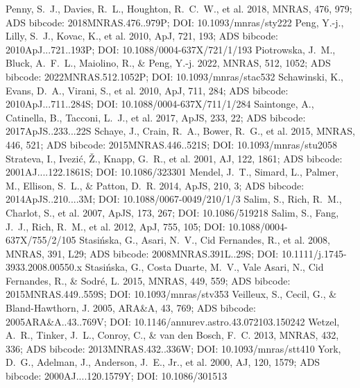 \documentclass[twocolumn]{aastex631}
\begin{document}
\begin{thebibliography}{}
 Penny, S.~J., Davies, R.~L., Houghton, R.~C.~W., et al. 2018, MNRAS, 476, 979; ADS bibcode: 2018MNRAS.476..979P; DOI: 10.1093/mnras/sty222
 Peng, Y.-j., Lilly, S.~J., Kovac, K., et al. 2010, ApJ, 721, 193; ADS bibcode: 2010ApJ...721..193P; DOI: 10.1088/0004-637X/721/1/193
 Piotrowska, J.~M., Bluck, A.~F.~L., Maiolino, R., \& Peng, Y.-j. 2022, MNRAS, 512, 1052; ADS bibcode: 2022MNRAS.512.1052P; DOI: 10.1093/mnras/stac532
 Schawinski, K., Evans, D.~A., Virani, S., et al. 2010, ApJ, 711, 284; ADS bibcode: 2010ApJ...711..284S; DOI: 10.1088/0004-637X/711/1/284
 Saintonge, A., Catinella, B., Tacconi, L.~J., et al. 2017, ApJS, 233, 22; ADS bibcode: 2017ApJS..233...22S
 Schaye, J., Crain, R.~A., Bower, R.~G., et al. 2015, MNRAS, 446, 521; ADS bibcode: 2015MNRAS.446..521S; DOI: 10.1093/mnras/stu2058
 Strateva, I., Ivezi{\'c}, {\v Z}., Knapp, G.~R., et al. 2001, AJ, 122, 1861; ADS bibcode: 2001AJ....122.1861S; DOI: 10.1086/323301
 Mendel, J.~T., Simard, L., Palmer, M., Ellison, S.~L., \& Patton, D.~R. 2014, ApJS, 210, 3; ADS bibcode: 2014ApJS..210....3M; DOI: 10.1088/0067-0049/210/1/3
 Salim, S., Rich, R.~M., Charlot, S., et al. 2007, ApJS, 173, 267; DOI: 10.1086/519218
 Salim, S., Fang, J.~J., Rich, R.~M., et al. 2012, ApJ, 755, 105; DOI: 10.1088/0004-637X/755/2/105
 Stasi{\'n}ska, G., Asari, N.~V., Cid Fernandes, R., et al. 2008, MNRAS, 391, L29; ADS bibcode: 2008MNRAS.391L..29S; DOI: 10.1111/j.1745-3933.2008.00550.x
 Stasi{\'n}ska, G., Costa Duarte, M.~V., Vale Asari, N., Cid Fernandes, R., \& Sodr{\'e}, L. 2015, MNRAS, 449, 559; ADS bibcode: 2015MNRAS.449..559S; DOI: 10.1093/mnras/stv353
 Veilleux, S., Cecil, G., \& Bland-Hawthorn, J. 2005, ARA\&A, 43, 769; ADS bibcode: 2005ARA\&A..43..769V; DOI: 10.1146/annurev.astro.43.072103.150242
 Wetzel, A.~R., Tinker, J.~L., Conroy, C., \& van den Bosch, F.~C. 2013, MNRAS, 432, 336; ADS bibcode: 2013MNRAS.432..336W; DOI: 10.1093/mnras/stt410
 York, D.~G., Adelman, J., Anderson, J.~E., Jr., et al. 2000, AJ, 120, 1579; ADS bibcode: 2000AJ....120.1579Y; DOI: 10.1086/301513
\end{thebibliography}
\end{document}
